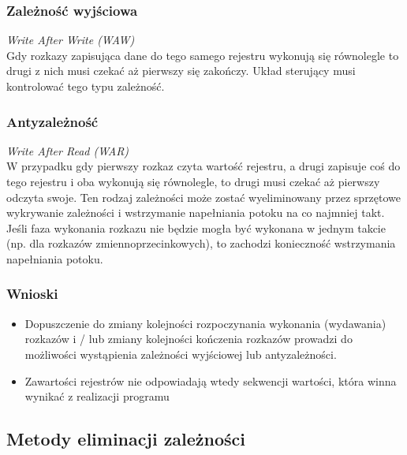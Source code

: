     	\subsubsection{Zależność wyjściowa}
    		\emph{Write After Write (WAW)}\\
    		Gdy rozkazy zapisująca dane do tego samego rejestru wykonują się równolegle to drugi z nich musi czekać aż pierwszy się zakończy. Układ sterujący musi kontrolować tego typu zależność.
		\subsubsection{Antyzależność}
	         \emph{Write After Read (WAR)}\\
	         W przypadku gdy pierwszy rozkaz czyta wartość rejestru, a drugi zapisuje coś do tego rejestru i oba wykonują się równolegle, to drugi musi czekać aż pierwszy odczyta swoje. Ten rodzaj zależności może zostać wyeliminowany przez sprzętowe wykrywanie zależności i wstrzymanie napełniania potoku na co najmniej takt.\\
	         Jeśli faza wykonania rozkazu nie będzie mogła być wykonana w jednym takcie (np. dla rozkazów zmiennoprzecinkowych), to zachodzi konieczność wstrzymania napełniania potoku.
        \subsubsection{Wnioski}
        \begin{samepage}
	        \begin{itemize}
	           	\item Dopuszczenie do zmiany kolejności rozpoczynania wykonania (wydawania) rozkazów i / lub zmiany kolejności kończenia rozkazów prowadzi do możliwości wystąpienia zależności wyjściowej lub antyzależności.
	           	\item Zawartości rejestrów nie odpowiadają wtedy sekwencji wartości, która winna wynikać z realizacji programu
	        \end{itemize}
	    \end{samepage}
        
	\subsection{Metody eliminacji zależności}
